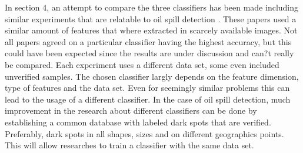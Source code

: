 In section 4, an attempt to compare the three classifiers has been made including similar experiments that are relatable to oil spill detection . These papers used a similar amount of features that where extracted in scarcely available images. Not all papers agreed on a particular classifier having the highest accuracy, but this could have been expected since the results are under discussion and can?t really be compared. Each experiment uses a different data set, some even included unverified samples. The chosen classifier largly depends on the feature dimension, type of features and the data set. Even for seemingly similar problems this can lead to the usage of a different classifier. In the case of oil spill detection, much improvement in the research about different classifiers can be done by establishing a common database with labeled dark spots that are verified. Preferably, dark spots in all shapes, sizes and on different geographics points. This will allow researches to train a classifier with the same data set.